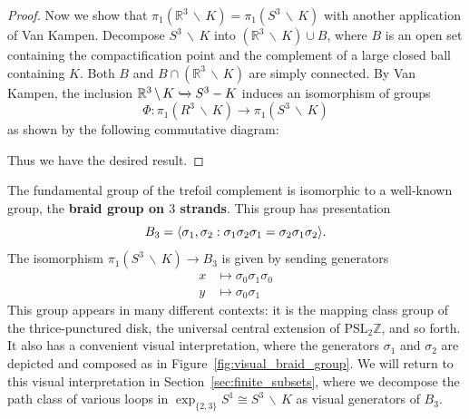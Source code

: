 \documentclass[12pt,twoside]{reedthesis}
\theoremstyle{definition}
\newcommand{\Z}{\mathbb{Z}}
\newcommand{\R}{\mathbb{R}}
\newcommand{\PSLZ}{\mathrm{PSL}_2{\Z}}
\newcommand{\exptwothree}{\exp_{\{2,3\}}}
\newcommand{\into}{\xhookrightarrow{}}
\newcommand{\wo}{\, \backslash \,}
\newcommand{\defnphrase}[1]{\textbf{#1}}
\DeclarePairedDelimiter\ang{\langle}{\rangle}
\begin{document}
\begin{proof}
  Now we show that $\pi_1(\R^3 \wo K) = \pi_1(S^3 \wo K)$ with another application of Van Kampen.
  Decompose $S^3 \wo K$ into $(\R^3 \wo K) \cup B$, where $B$ is an open set containing the compactification point and the complement of a large closed ball containing $K$.
  Both $B$ and $B \cap (\R^3 \wo K)$ are simply connected.
  By Van Kampen, the inclusion $\R^3 \wo K \into S^3 - K$ induces an isomorphism of groups
  \begin{equation*}
    \Phi : \pi_1(R^3 \wo K) \to \pi_1(S^3 \wo K)
  \end{equation*}
  as shown by the following commutative diagram:
  \begin{center}
  \end{center}
  Thus we have the desired result.
\end{proof}

The fundamental group of the trefoil complement is isomorphic to a well-known group, the \defnphrase{braid group on $3$ strands}.
This group has presentation
\begin{equation*}
  B_3 = \ang{\sigma_1, \sigma_2 : \sigma_1 \sigma_2 \sigma_1 = \sigma_2 \sigma_1 \sigma_2}.
\end{equation*}
The isomorphism $\pi_1(S^3 \wo K) \to B_3$ is given by sending generators
\begin{equation}\label{eq:iso_pi1_b3}
  \begin{aligned}
    x &\mapsto \sigma_0 \sigma_1 \sigma_0 \\
    y &\mapsto \sigma_0 \sigma_1
  \end{aligned}
\end{equation}
This group appears in many different contexts: it is the mapping class group of the thrice-punctured disk, the universal central extension of $\PSLZ$, and so forth.
It also has a convenient visual interpretation, where the generators $\sigma_1$ and $\sigma_2$ are depicted and composed as in Figure~\ref{fig:visual_braid_group}.
We will return to this visual interpretation in Section~\ref{sec:finite_subsets}, where we decompose the path class of various loops in $\exptwothree S^1 \cong S^3 \wo K$ as visual generators of $B_3$. 
\end{document}
